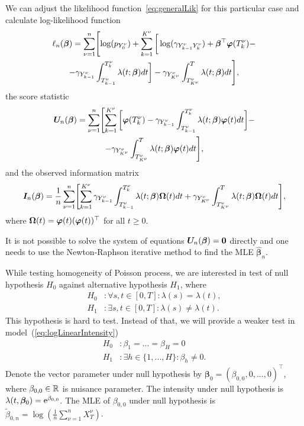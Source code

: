 {We can adjust the likelihood function~\eqref{eq:generalLik} for this particular case and calculate log-likelihood function
\begin{multline*}
	\ell_n (\bm{\beta})
	= \sum_{\nu=1}^n \Biggl[ \log( p_{Y_0^{\nu}}) +
	\sum_{k=1}^{K^{\nu}} \bigg[ \log(\gamma_{Y_{k-1}^{\nu} Y_{k}^{\nu}}) + \bm{\beta}^\top \bm{\varphi} (T_k^{\nu}) - \\
	- \gamma_{Y_{k-1}^{\nu}} \int_{T_{k-1}^{\nu}}^{T_k^{\nu}} \lambda(t; \bm{\beta}) dt \bigg] -
	\gamma_{Y_{K^{\nu}}^{\nu}} \int_{T_{K^{\nu}}^{\nu}}^{T} \lambda(t; \bm{\beta}) dt \Biggr],
\end{multline*}
the score statistic
\begin{multline*}
	\bm{U}_n (\bm{\beta})
	= \sum_{\nu=1}^n \Biggl[ \sum_{k=1}^{K^{\nu}} \bigg[ \bm{\varphi} (T_k^{\nu}) -
	\gamma_{Y_{k-1}^{\nu}} \int_{T_{k-1}^{\nu}}^{T_k^{\nu}} \lambda(t; \bm{\beta}) \bm{\varphi} (t) dt \bigg] - \\
	- \gamma_{Y_{K^{\nu}}^{\nu}} \int_{T_{K^{\nu}}^{\nu}}^{T} \lambda(t; \bm{\beta}) \bm{\varphi} (t) dt \Biggr],
\end{multline*}
	and the observed information matrix
\begin{multline*}
	\bm{I}_n (\bm{\beta})
	= \frac{1}{n} \sum_{\nu=1}^n \Biggl[ \sum_{k=1}^{K^{\nu}}
	\gamma_{Y_{k-1}^{\nu}} \int_{T_{k-1}^{\nu}}^{T_k^{\nu}} \lambda(t; \bm{\beta}) \bm{\Omega} (t) dt
	+ \gamma_{Y_{K^{\nu}}^{\nu}} \int_{T_{K^{\nu}}^{\nu}}^{T} \lambda(t; \bm{\beta}) \bm{\Omega} (t) dt \Biggr],
\end{multline*}
where	$\bm{\Omega} (t) = \bm{\varphi} (t) (\bm{\varphi} (t))^\top$ for all $t \geq 0$.

It is not possible to solve the system of equations $\bm{U}_n (\bm{\beta}) = \bm{0}$ directly and one needs to use the Newton-Raphson iterative method to find the MLE $\hat{\bm{\beta}}_n$.

\begin{example}
	While testing homogeneity of Poisson process, we are interested in test of null hypothesis $H_0$ against alternative hypothesis $H_1$, where
	\begin{align*}
		H_0 &: \forall s,t \in [0,T] : \lambda(s) = \lambda(t), \\
		H_1 &: \exists s,t \in [0,T] : \lambda(s) \neq \lambda(t).
	\end{align*}
	This hypothesis is hard to test. Instead of that, we will provide a weaker test in model~(\ref{eq:logLinearIntensity})
		\begin{align*}
			H_0 &: \beta_1 = ... = \beta_H = 0 \\
			H_1 &: \exists h \in \{1, ..., H\} : \beta_h \neq 0.
	\end{align*}
	Denote the vector parameter under null hypothesis by $\bm{\beta}_0 = (\beta_{0,0}, 0, ..., 0)^{\top}$, where $\beta_{0,0} \in \mathbb{R}$ is nuisance parameter. The intensity under null hypothesis is $\lambda(t, \bm{\beta}_0) = \operatorname{\mathrm{e}}^{\beta_{0,0}}$. The MLE of $\beta_{0,0}$ under null hypothesis is $\tilde{\beta}_{0,n} = \log (\frac{1}{n} \sum_{\nu = 1}^n X_T^{\nu})$.
	

\end{example}}
